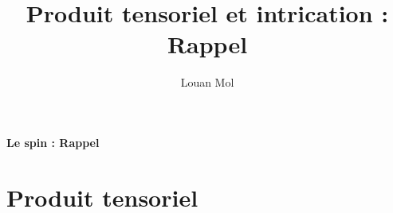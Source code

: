 \documentclass[11pt,a4paper,oneside]{article}
\title{Produit tensoriel et intrication : Rappel}
\author{Louan Mol}
\begin{document}
\begin{center}
    {\huge \textbf{Le spin : Rappel}}
\end{center}

\section{Produit tensoriel}
\end{document}
